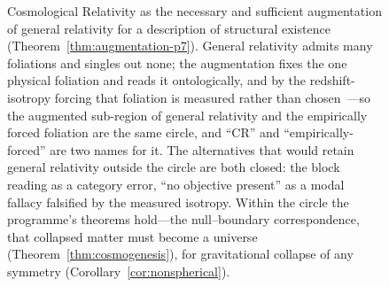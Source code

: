 \documentclass[11pt,a4paper]{article}
\theoremstyle{plain}
\theoremstyle{definition}
\theoremstyle{remark}
\begin{document}
\begin{figure}[htbp]
\centering
{}
\caption{Cosmological Relativity as the necessary and sufficient augmentation of general relativity for a description of structural existence (Theorem~\ref{thm:augmentation-p7}). General relativity admits many foliations and singles out none; the augmentation fixes the one physical foliation and reads it ontologically, and by the redshift-isotropy forcing that foliation is measured rather than chosen~\cite{JanzenModernParallax}---so the augmented sub-region of general relativity and the empirically forced foliation are the same circle, and ``CR'' and ``empirically-forced'' are two names for it. The alternatives that would retain general relativity outside the circle are both closed: the block reading as a category error, ``no objective present'' as a modal fallacy falsified by the measured isotropy. Within the circle the programme's theorems hold---the null--boundary correspondence, that collapsed matter must become a universe (Theorem~\ref{thm:cosmogenesis}), for gravitational collapse of any symmetry (Corollary~\ref{cor:nonspherical}).}
\label{fig:cr-gr-venn}
\end{figure}
\end{document}
